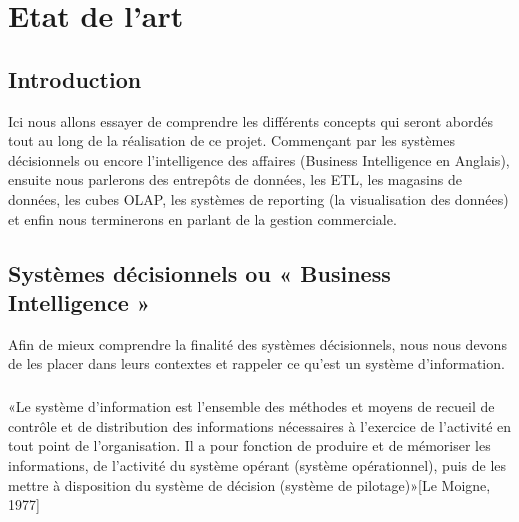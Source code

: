 \chapter{Etat de l'art}

\section*{Introduction}%
%
Ici nous allons essayer de comprendre les différents concepts qui seront abordés tout au long de la réalisation de ce projet. Commençant par les systèmes décisionnels ou encore l’intelligence des affaires (Business Intelligence en Anglais), ensuite nous parlerons des entrepôts de données, les ETL, les magasins de données, les cubes OLAP, les systèmes de reporting (la visualisation des données) et enfin nous terminerons en parlant de la gestion commerciale.


\section{Systèmes décisionnels ou « Business Intelligence »}
Afin de mieux comprendre la finalité des systèmes décisionnels, nous nous devons de les placer dans leurs contextes et rappeler ce qu’est un système d’information.

\paragraph{}
«Le système d’information est l’ensemble des méthodes et moyens de recueil de contrôle et de distribution des informations nécessaires à l’exercice de l’activité en tout point de l’organisation. Il a pour fonction de produire et de mémoriser les informations, de l’activité du système opérant (système opérationnel), puis de les mettre à disposition du système de décision (système de pilotage)»[Le Moigne, 1977]
